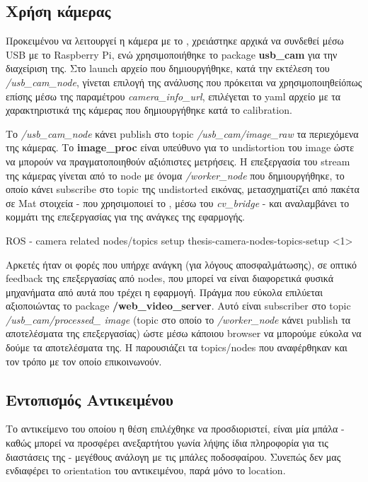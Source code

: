 
\subsection{Χρήση κάμερας} \label{sec:camera-usage}
Προκειμένου να λειτουργεί η κάμερα με το , χρειάστηκε αρχικά να συνδεθεί μέσω USB με το Raspberry Pi, ενώ χρησιμοποιήθηκε το package \textbf{usb\_cam} για την διαχείριση της. Στο launch αρχείο που δημιουργήθηκε, κατά την εκτέλεση του \textit{/usb\_cam\_node}, γίνεται επιλογή της ανάλυσης που πρόκειται να χρησιμοποιηθεί\udot όπως επίσης μέσω της παραμέτρου \textit{camera\_info\_url}, επιλέγεται το yaml αρχείο με τα χαρακτηριστικά της κάμερας που δημιουργήθηκε κατά το calibration. 

Το \textit{/usb\_cam\_node} κάνει publish στο topic \textit{/usb\_cam/image\_raw} τα περιεχόμενα της κάμερας. Το \textbf{image\_proc} είναι υπεύθυνο για το undistortion του image ώστε να μπορούν να πραγματοποιηθούν αξιόπιστες μετρήσεις.  Η επεξεργασία του stream της κάμερας γίνεται από το node με όνομα \textit{/worker\_node} που δημιουργήθηκε, το οποίο κάνει subscribe στο topic της undistorted εικόνας, μετασχηματίζει από πακέτα  σε Mat στοιχεία - που χρησιμοποιεί το ,  μέσω του \textit{cv\_bridge} - και αναλαμβάνει το κομμάτι της  επεξεργασίας για της ανάγκες της εφαρμογής. 

%
{ROS - camera related nodes/topics setup}%
{thesis-camera-nodes-topics-setup}%
<1>

Αρκετές ήταν οι φορές που υπήρχε ανάγκη (για λόγους αποσφαλμάτωσης), σε ο\-πτι\-κό feedback της  επεξεργασίας από nodes, που μπορεί να είναι διαφορετικά φυσικά μηχανήματα από αυτά που τρέχει η εφαρμογή. Πράγμα που εύκολα επιλύεται αξιοποιώντας το package \textbf{/web\_video\_server}. Αυτό είναι subscriber στο topic \textit{/usb\_\-cam/processed\_ image} (topic στο οποίο το \textit{/worker\_node} κάνει publish τα αποτελέσματα της επεξεργασίας) ώστε μέσω κάποιου browser να μπορούμε εύκολα να δούμε τα αποτελέσματα της. Η  παρουσιάζει τα topics/nodes που αναφέρθηκαν και τον τρόπο με τον οποίο επι\-κοι\-νω\-νούν.


\subsection{Εντοπισμός Αντικειμένου}
Το αντικείμενο του οποίου η θέση επιλέχθηκε να προσδιοριστεί, είναι μία μπάλα - καθώς μπορεί να προσφέρει ανεξαρτήτου γωνία λήψης ίδια πληροφορία για τις διαστάσεις της - μεγέθους ανάλογη με τις μπάλες ποδοσφαίρου. 
Συνεπώς δεν μας ενδιαφέρει το orientation του αντικειμένου, παρά μόνο το location.

